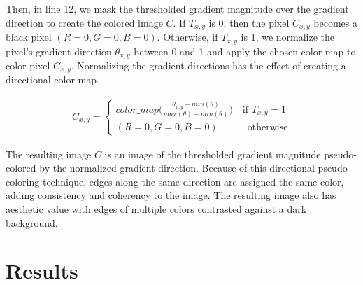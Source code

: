 \documentclass{article}
\begin{document}
Then, in line 12, we mask the thresholded gradient magnitude over the gradient direction to create the colored image $C$. If $T_{x,y}$ is 0, then the pixel $C_{x, y}$ becomes a black pixel $(R=0, G=0, B=0)$. Otherwise, if $T_{x,y}$ is 1, we normalize the pixel's gradient direction $\theta_{x, y}$ between 0 and 1 and apply the chosen color map to color pixel $C_{x, y}$. Normalizing the gradient directions has the effect of creating a directional color map.

\begin{align}
C_{x,y} = \left\{
  \begin{array}{lr}
    color\_map \Big(\frac{\theta_{x,y} - min(\theta)}{max(\theta) - min(\theta)} \Big) \quad \text{if  } T_{x,y} = 1 \\
    (R=0, G=0, B=0) \quad \quad \quad \text{otherwise}
  \end{array}
\right.
\end{align}

The resulting image $C$ is an image of the thresholded gradient magnitude pseudo-colored by the normalized gradient direction. Because of this directional pseudo-coloring technique, edges along the same direction are assigned the same color, adding consistency and coherency to the image. The resulting image also has aesthetic value with edges of multiple colors contrasted against a dark background.

\section{Results}
\end{document}
